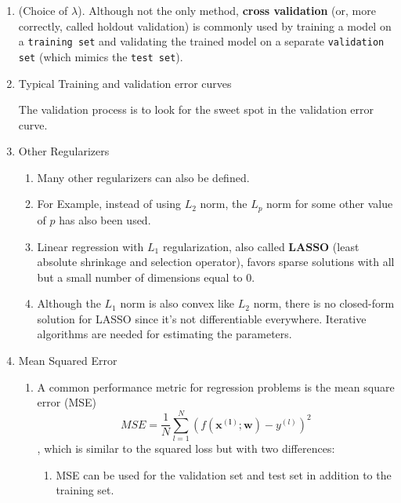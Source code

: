 \documentclass[11pt]{article}
\begin{document}
\begin{enumerate}
\begin{enumerate}
\end{enumerate}
\item (Choice of $\lambda$). 
Although not the only method, \textbf{cross validation} (or, more correctly, called holdout validation) is commonly used by training a model on a \texttt{training set} and validating the trained model on a separate \texttt{validation set} (which mimics the \texttt{test set}).\\
\item Typical Training and validation error curves
\begin{center}
\end{center}
The validation process is to look for the sweet spot in the validation error curve.
\item Other Regularizers
\begin{enumerate}
\item Many other regularizers can also be defined.
\item For Example, instead of using $L_2$ norm, the $L_p$ norm for some other value of $p$ has also been used.
\item Linear regression with $L_1$ regularization, also called \textbf{LASSO} (least absolute shrinkage and selection operator), favors sparse solutions with all but a small number of dimensions equal to $0$. 
\item Although the $L_1$ norm is also convex like $L_2$ norm, there is no closed-form solution for LASSO since it's not differentiable everywhere. Iterative algorithms are needed for estimating the parameters.
\end{enumerate}
\item Mean Squared Error
\begin{enumerate}
\item A common performance metric for regression problems is the mean square error (MSE) $$MSE = \frac{1}{N} \sum_{l=1}^{N} (f(\mathbf{x^{(l)}; w})- y^{(l)})^2$$, which is similar to the squared loss but with two differences:
\begin{enumerate}
\item MSE can be used for the validation set and test set in addition to the training set.

\end{enumerate}
\end{enumerate}
\end{enumerate}
\end{document}
